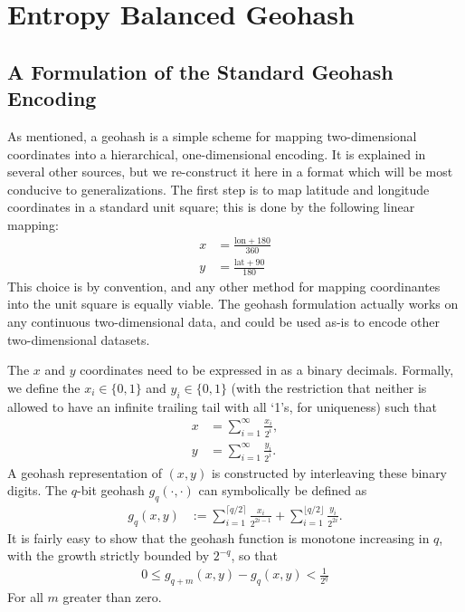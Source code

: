 \documentclass[nips13submit_09,times,art10]{article} %
\begin{document}
\section{Entropy Balanced Geohash}  \label{sec:geohash}

\subsection{A Formulation of the Standard Geohash Encoding}

As mentioned, a geohash is a simple scheme for mapping two-dimensional coordinates into a
hierarchical, one-dimensional encoding. It is explained in several other sources, but we
re-construct it here in a format which will be most conducive to generalizations.
The first step is to map latitude and longitude coordinates in a
standard unit square; this is done by the following linear mapping:
\begin{align}
x &= \frac{\text{lon} + 180}{360} \\
y &= \frac{\text{lat} + 90}{180}
\end{align}
This choice is by convention, and any other method for mapping coordinantes
into the unit square is equally viable. The geohash formulation actually works
on any continuous two-dimensional data, and could be used  as-is to encode other
two-dimensional datasets.

The $x$ and $y$ coordinates need to be expressed in as a binary decimals.
Formally, we define the $x_i \in \{0,1 \}$ and $y_i \in \{0,1\}$
(with the restriction that neither is allowed to have an infinite trailing
tail with all `1's, for uniqueness) such that
\begin{align}
x &= \sum_{i=1}^{\infty} \frac{x_i}{2^i},\\
y &= \sum_{i=1}^{\infty} \frac{y_i}{2^i}.
\end{align}
A geohash representation of $(x,y)$ is constructed by interleaving these
binary digits. The $q$-bit geohash $g_q(\cdot,\cdot)$ can symbolically
be defined as
\begin{align}
g_q(x,y) &:=  \sum_{i=1}^{\lceil q/2 \rceil} \frac{x_i}{2^{2i-1}} +
              \sum_{i=1}^{\lfloor q/2 \rfloor} \frac{y_i}{2^{2i}}.
\end{align}
It is fairly easy to show that the geohash function is monotone increasing
in $q$, with the growth strictly bounded by $2^{-q}$, so that
\begin{align}
0 \leq g_{q+m}(x,y) - g_{q}(x,y) < \frac{1}{2^q}
\end{align}
For all $m$ greater than zero.
\end{document}
